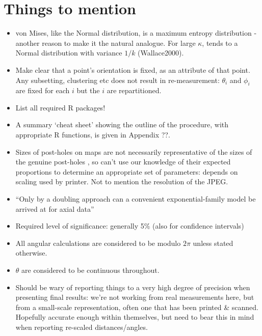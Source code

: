 \documentclass[10pt,fleqn]{article}
\numberwithin{equation}{section}
\begin{document}
\section*{Things to mention}
\begin{itemize}

\item
von Mises, like the Normal distribution, is a maximum entropy distribution - another reason to make it the natural analogue. For large $\kappa$, tends to a Normal distribution with variance $1/k$ (Wallace2000).

\item
Make clear that a point's orientation is fixed, as an attribute of that point. Any subsetting, clustering etc does not result in re-measurement: $\theta_i$ and $\phi_i$ are fixed for each $i$ but the $i$ are repartitioned.

\item
List all required R packages!

\item
A summary `cheat sheet' showing the outline of the procedure, with appropriate R functions, is given in Appendix ??.

\item
Sizes of post-holes on maps are not necessarily representative of the sizes of the genuine post-holes , so can't use our knowledge of their expected proportions to determine an appropriate set of parameters: depends on scaling used by printer. Not to mention the resolution of the JPEG.

\item 
``Only by a doubling approach can a convenient exponential-family model be arrived at for axial data'' \cite{Arnold2011}

\item
Required level of significance: generally 5\% (also for confidence intervals)

\item
All angular calculations are considered to be modulo $2\pi$ unless stated otherwise.

\item
$\theta$ are considered to be continuous throughout.

\item
Should be wary of reporting things to a very high degree of precision when presenting final results: we're not working from real measurements here, but from a small-scale representation, often one that has been printed \& scanned. Hopefully accurate enough within themselves, but need to bear this in mind when reporting re-scaled distances/angles.


\end{itemize}
\end{document}
